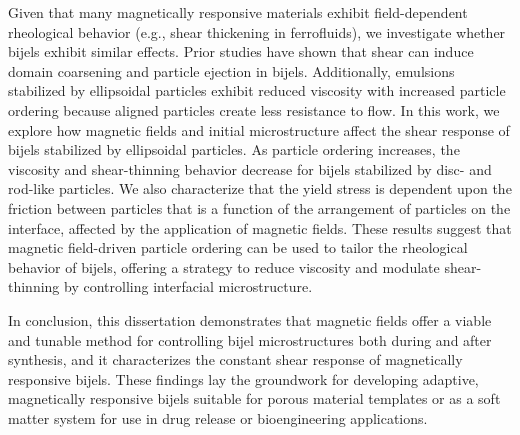 \begin{front}
    Given that many magnetically responsive materials exhibit field-dependent rheological behavior (e.g., shear thickening in ferrofluids), 
    we investigate whether bijels exhibit similar effects. Prior studies have shown that shear can induce domain coarsening and particle 
    ejection in bijels. Additionally, emulsions stabilized by ellipsoidal particles exhibit reduced viscosity with increased particle ordering because 
    aligned particles create less resistance to flow. In this work, we explore how magnetic fields and initial microstructure affect the shear 
    response of bijels stabilized by ellipsoidal particles. As particle ordering increases, the viscosity and shear-thinning behavior decrease for 
    bijels stabilized by disc- and rod-like particles. We also characterize that the yield stress is dependent upon the friction between particles
    that is a function of the arrangement of particles on the interface, affected by the application of magnetic fields. These results suggest 
    that magnetic field-driven particle ordering can be used to tailor the rheological behavior of bijels, offering a strategy to reduce viscosity 
    and modulate shear-thinning by controlling interfacial microstructure. 
    
    In conclusion, this dissertation demonstrates that magnetic fields offer a viable and tunable method for controlling bijel microstructures 
    both during and after synthesis, and it characterizes the constant shear response of magnetically responsive bijels. These findings 
    lay the groundwork for developing adaptive, magnetically responsive bijels suitable for porous material templates or as a soft matter 
    system for use in drug release or bioengineering applications.

\end{front}